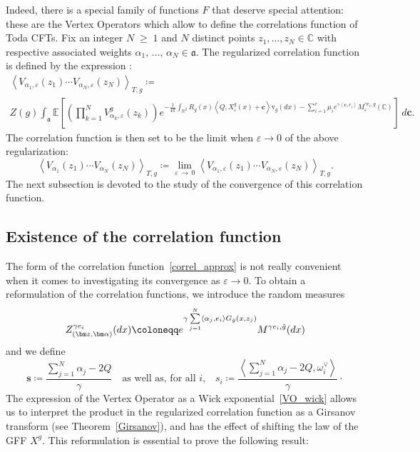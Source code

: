 \documentclass[10pt]{amsart}
\theoremstyle{definition}\newtheorem{defi}[theo]{Definition}\newtheorem{rema}[theo]{Remark}\newtheorem{exam}[theo]{Example}\newtheorem{exem}[theo]{Example}\newtheorem{nota}[theo]{Notation}
\renewcommand{\geq}{\;\geqslant\;}
\newcommand{\frka}{\mathfrak{a}}
\newcommand{\rmv}{\mathrm{v}}
\newcommand{\C}{\mathbb{C}}
\newcommand{\R}{\mathbb{R}}
\newcommand{\E}{\mathbb{E}}
\newcommand*\eps{\varepsilon}
\let\oldhat\hat
\renewcommand*{\hat}[1]{\mathchoice{\widehat{#1}}{\widehat{#1}}{\oldhat{#1}}{\oldhat{#1}}}
\begin{document}
Indeed, there is a special family of functions $F$ that deserve special attention: these are the Vertex Operators which allow to define the correlations function of Toda CFTs. Fix an integer $N\geq 1$ and $N$ distinct points $z_1,\dots,z_N\in \C$ with respective associated weights $\alpha_1,\,\dots,\,\alpha_N\in \frka$. The regularized correlation function is defined by the expression :
\begin{multline}\label{correl_approx}
\left\langle V_{\alpha_1,\eps}(z_1) \cdots V_{\alpha_N,\eps}(z_N) \right\rangle_{T,g} \coloneqq \\
Z(g) \int_{\frka} \E \left[\left(\prod_{k=1}^N V^g_{\alpha_k,\eps}(z_k) \right) e^{-\frac{1}{4 \pi} \int_{\R^2} R_g(x) \left\langle Q, X_\eps^g(x)+\bm c \right\rangle \rmv_ g(dx) - \sum_{i=1}^{r} \mu_i e^{\gamma \left\langle \bm c,e_i\right\rangle }M_\eps^{ \gamma e_i,g}(\C)} \right]\,d\bm c.
\end{multline}
The correlation function is then set to be the limit when $\eps\to0$ of the above regularization:
\begin{equation}\label{correl_limit}
\left\langle V_{\alpha_1}(z_1) \cdots V_{\alpha_N}(z_N) \right\rangle_{T,g} \coloneqq \underset{\eps\,\to\,0}{\lim} \left\langle V_{\alpha_1,\eps}(z_1) \cdots V_{\alpha_N,\eps}(z_N) \right\rangle_{T,g}.
\end{equation}
The next subsection is devoted to the study of the convergence of this correlation function.

\subsection{Existence of the correlation function}

The form of the correlation function~\eqref{correl_approx} is not really convenient when it comes to investigating its convergence as $\eps\to0$. To obtain a reformulation of the correlation functions, we introduce the random measures
\begin{equation}\label{GMC_insert}
Z_{\left(\bm z,\bm \alpha\right)}^{\gamma e_i} (dx)\coloneqq e^{\gamma \sum\limits_{j=1}^N \left\langle\alpha_j,e_i \right\rangle G_{\hat{g}} (x,z_j) } M^{\gamma e_i,\hat g}(dx)
\end{equation}
and we define
\begin{equation}
\bm s\coloneqq \frac{\sum\limits_{j=1}^N \alpha_j-2Q}\gamma\quad\text{as well as, for all $i$,}\quad s_i\coloneqq \frac{\left\langle \sum\limits_{j=1}^N \alpha_j-2Q,\omega_i^\vee \right\rangle}{\gamma} \cdot
\end{equation}
The expression of the Vertex Operator as a Wick exponential~\eqref{VO_wick} allows us to interpret the product in the regularized correlation function as a Girsanov transform (see Theorem~\ref{Girsanov}), and has the effect of shifting the law of the GFF $X^g$. This reformulation is essential to prove the following result:
\end{document}

